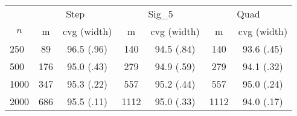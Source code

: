 \documentclass{article}
\begin{document}
\begin{tabular}{lcccccc}
   \toprule
 
           & \multicolumn{2}{c}{Step}& \multicolumn{2}{c}{Sig\_5}& \multicolumn{2}{c}{Quad} \\ 
             \cmidrule(l{2pt}r{2pt}){2-3} \cmidrule(l{2pt}r{2pt}){4-5} \cmidrule(l{2pt}r{2pt}){6-7} 
             \multicolumn{1}{c}{$n$} & \multicolumn{1}{c}{m}& \multicolumn{1}{c}{cvg (width)}& \multicolumn{1}{c}{m}& \multicolumn{1}{c}{cvg (width)}& \multicolumn{1}{c}{m}& \multicolumn{1}{c}{cvg (width)} \\ \midrule 
        250 & 89 & 96.5 (.96) & 140 & 94.5 (.84) & 140 & 93.6 (.45) \\ 
  500 & 176 & 95.0 (.43) & 279 & 94.9 (.59) & 279 & 94.1 (.32) \\ 
  1000 & 347 & 95.3 (.22) & 557 & 95.2 (.44) & 557 & 95.0 (.24) \\ 
  2000 & 686 & 95.5 (.11) & 1112 & 95.0 (.33) & 1112 & 94.0 (.17) \\ 
   \hline
\end{tabular}
\end{document}
